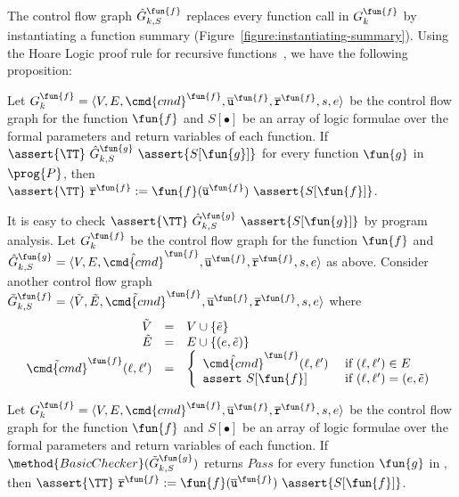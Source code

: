 The control flow graph $\hat{G}^{\fun{f}}_{k,S}$ replaces every
function call in $G_k^\fun{f}$ by instantiating a function
summary (Figure~\ref{figure:instantiating-summary}).
Using the Hoare Logic proof rule for recursive functions~\cite{Oheimb99}, we have the
following proposition:
\begin{proposition}
  \label{proposition:check_summary}
  Let $G^\fun{f}_k = \langle V, E, \cmd{cmd}^\fun{f}, \overline{\mathtt{u}}^\fun{f}, \overline{\mathtt{r}}^\fun{f},s,e \rangle$ be the control flow graph for the function
  $\fun{f}$ and $S[\bullet]$ be an array of logic formulae over the formal
  parameters and return variables of each function. If $\assert{\TT}\
  \hat{G}^\fun{g}_{k,S}\ \assert{S[\fun{g}]}$ for every
  function $\fun{g}$ in $\prog{P}$, then $\assert{\TT}\ \overline{\mathtt{r}}^\fun{f} :=
  \fun{f} (\overline{\mathtt{u}}^\fun{f})\ \assert{S[\fun{f}]}$.
\end{proposition}

It is easy to check $\assert{\TT}\ \hat{G}^\fun{g}_{k,S}\
\assert{S[\fun{g}]}$ by program analysis. Let $G_k^{\fun{f}}$ be
the control flow graph for the function $\fun{f}$ and
$\hat{G}^\fun{g}_{k,S} = \langle V, E, \hat{\cmd{cmd}}^\fun{f}, \overline{\mathtt{u}}^\fun{f}, \overline{\mathtt{r}}^\fun{f},s,e \rangle$ as
above. Consider another control flow graph $\tilde{G}^\fun{f}_{k,S} =
\langle \tilde{V}, \tilde{E}, \tilde{\cmd{cmd}}^\fun{f} , \overline{\mathtt{u}}^\fun{f}, \overline{\mathtt{r}}^\fun{f},s,e \rangle$ where
\begin{equation*}
  \begin{array}{rcl}
    \tilde{V} & = & V \cup \{ \tilde{e} \}\\
    \tilde{E} & = & E \cup \{ (e, \tilde{e}) \}\\
    \tilde{\cmd{cmd}}^\fun{f} (\ell, \ell') & = &
    \left\{
      \begin{array}{ll}
        \hat{\cmd{cmd}}^\fun{f} (\ell, \ell') &
        \text{ if } (\ell, \ell') \in E\\
        \mathtt{assert\ } S[\fun{f}] &
        \text{ if } (\ell, \ell') = (e, \tilde{e})
      \end{array}
    \right.
  \end{array}
\end{equation*}

\begin{corollary}
  Let $G^\fun{f}_k = \langle V, E, \cmd{cmd}^\fun{f}, \overline{\mathtt{u}}^\fun{f}, \overline{\mathtt{r}}^\fun{f},s,e \rangle$ be the control flow graph for the function
  $\fun{f}$ and $S[\bullet]$ be an array of logic formulae over the formal
  parameters and return variables of each function. If $\method{BasicChecker}
  (\tilde{G}^\fun{g}_{k,S})$ returns $\mathit{Pass}$ for every function
  $\fun{g}$ in \prog{P}, then $\assert{\TT}\ \overline{\mathtt{r}}^\fun{f} :=
  \fun{f} (\overline{\mathtt{u}}^\fun{f})\ \assert{S[\fun{f}]}$.
  \label{corollary:check-summary}
\end{corollary}

